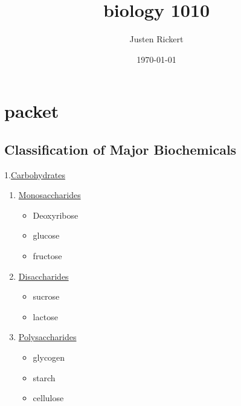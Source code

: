 \documentclass[11pt]{article}
\author{Justen Rickert}
\date{\today}
\title{biology 1010}
\begin{document}
\maketitle
\tableofcontents


\section{packet}
\label{sec:org83b50b7}
\subsection{Classification of Major Biochemicals}
\label{sec:orge751b41}
1.\hyperref[sec:orga968f94]{Carbohydrates}
\begin{enumerate}
\item \hyperref[sec:org9883b36]{Monosaccharides}
\begin{itemize}
\item Deoxyribose
\item glucose
\item fructose
\end{itemize}
\item \hyperref[sec:org5773569]{Disaccharides}
\begin{itemize}
\item sucrose
\item lactose
\end{itemize}
\item \hyperref[sec:org605872d]{Polysaccharides}
\begin{itemize}
\item glycogen
\item starch
\item cellulose
\end{itemize}
\end{enumerate}
\end{document}
